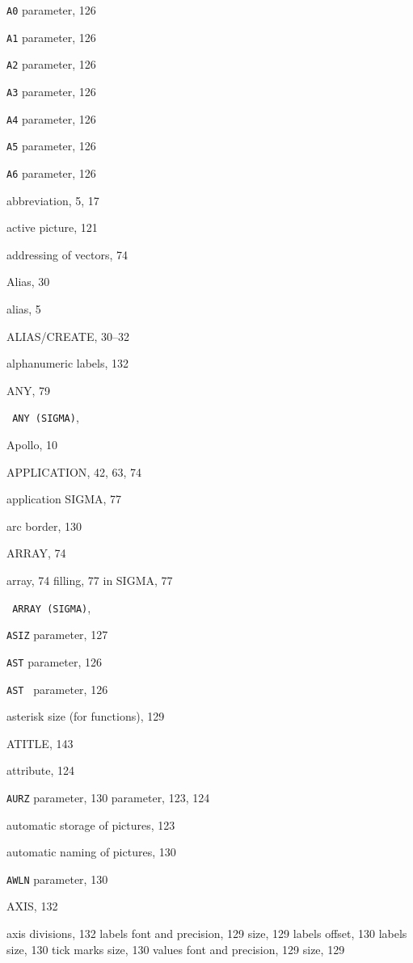 \begin{theindex}
  \item {\tt A0}
     parameter, 126
  \item {\tt A1}
     parameter, 126
  \item {\tt A2}
     parameter, 126
  \item {\tt A3}
     parameter, 126
  \item {\tt A4}
     parameter, 126
  \item {\tt A5}
     parameter, 126
  \item {\tt A6}
     parameter, 126
  \item abbreviation, 5, 17
  \item active picture, 121
  \item addressing of vectors, 74
  \item Alias, 30
  \item alias, 5
  \item {\ttfamily  ALIAS/CREATE}, 30--32
  \item alphanumeric
    \subitem labels, 132
  \item {\ttfamily  ANY}, 79
  \item \texttt  { ANY \textrm  {(SIGMA)}}, 
  \item Apollo, 10
  \item {\ttfamily  APPLICATION}, 42, 63, 74
  \item application SIGMA, 77
  \item arc
    \subitem border, 130
  \item {\ttfamily  ARRAY}, 74
  \item array, 74
    \subitem filling, 77
    \subitem in SIGMA, 77
  \item \texttt  { ARRAY \textrm  {(SIGMA)}}, 
  \item {\tt ASIZ}
     parameter, 127
  \item {\tt AST}
     parameter, 126
  \item {\tt AST }
     parameter, 126
  \item asterisk size (for functions), 129
  \item {\ttfamily  ATITLE}, 143
  \item attribute, 124
  \item {\tt AURZ}
     parameter, 130
     parameter, 123, 124
  \item automatic
    \subitem storage of pictures, 123
  \item automatic naming of pictures, 130
  \item {\tt AWLN}
     parameter, 130
  \item {\ttfamily  AXIS}, 132
  \item axis
    \subitem divisions, 132
    \subitem labels
      \subsubitem font and precision, 129
      \subsubitem size, 129
    \subitem labels offset, 130
    \subitem labels size, 130
    \subitem tick marks size, 130
    \subitem values
      \subsubitem font and precision, 129
      \subsubitem size, 129


\end{theindex}
